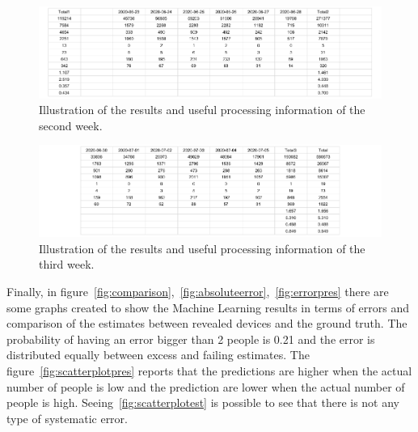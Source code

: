 \begin{figure}[h]
\centering 
\includegraphics[width=1\textwidth]{images/testresults2} 
\caption{Illustration of the results and useful processing information of the second week.}
\label{fig:testresults2}
\end{figure}

\begin{figure}[h]
\centering 
\includegraphics[width=1\textwidth]{images/testresults3} 
\caption{Illustration of the results and useful processing information of the third week.}
\label{fig:testresults3}
\end{figure}


Finally, in figure~\ref{fig:comparison},~\ref{fig:absoluteerror},~\ref{fig:errorpres} there are some graphs created to show the Machine Learning results in terms of errors and comparison of the estimates between revealed devices and the ground truth. The probability of having an error bigger than 2 people is 0.21 and the error is distributed equally between excess and failing estimates. The figure~\ref{fig:scatterplotpres} reports that the predictions are higher when the actual number of people is low and the prediction are lower when the actual number of people is high. Seeing~\ref{fig:scatterplotest} is possible to see that there is not any type of systematic error.

